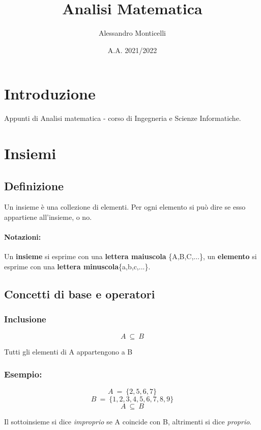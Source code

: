 \documentclass{article}
\title{Analisi Matematica}
\author{Alessandro Monticelli}
\date{A.A. 2021/2022}
\begin{document}
  
\maketitle
\newpage
\tableofcontents
\newpage
\section*{Introduzione}
    Appunti di Analisi matematica - corso di Ingegneria e Scienze Informatiche.
\newpage
\section{Insiemi}
    \subsection{Definizione}
        Un insieme è una collezione di elementi. Per ogni elemento si può dire se esso appartiene all'insieme, o no.
    \paragraph{Notazioni:}Un \textbf{insieme} si esprime con una \textbf{lettera maiuscola} \{A,B,C,...\}, 
        un \textbf{elemento} si esprime con una \textbf{lettera minuscola}\{a,b,c,...\}.

    \subsection{Concetti di base e operatori}
    \subsubsection{Inclusione}
        \begin{LARGE}
            \begin{equation*}
                A\ \subseteq\ B
            \end{equation*}
        \end{LARGE}
        Tutti gli elementi di A appartengono a B\newline
        
        \subsubsection*{Esempio:}
        
        \begin{LARGE}
            \begin{equation*}
                A\ =\ \{2,5,6,7\}
            \end{equation*}
            \begin{equation*}
                B\ =\ \{1,2,3,4,5,6,7,8,9\}
            \end{equation*}
            \begin{equation*}
                A\ \subseteq\ B
            \end{equation*}
        \end{LARGE}
        Il sottoinsieme si dice \textit{improprio} se A coincide con B, altrimenti si dice \textit{proprio}.
\end{document}
